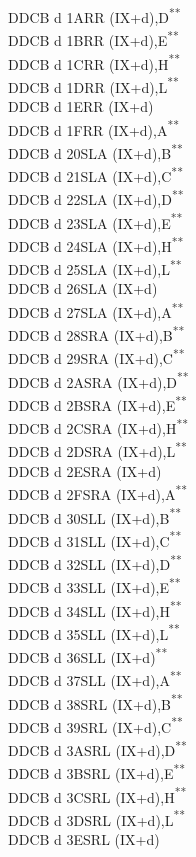 \documentclass[12pt,twoside,openright,a4paper]{book}
\newcommand{\UNDOC}{\textnormal{\textsuperscript{**}}}
\begin{document}
\begin{multicols}{3}
{\begin{tabbing}
	DDCB d 1A\>RR (IX+d),D\UNDOC\\
	DDCB d 1B\>RR (IX+d),E\UNDOC\\
	DDCB d 1C\>RR (IX+d),H\UNDOC\\
	DDCB d 1D\>RR (IX+d),L\UNDOC\\
	DDCB d 1E\>RR (IX+d)\\
	DDCB d 1F\>RR (IX+d),A\UNDOC\\
	DDCB d 20\>SLA (IX+d),B\UNDOC\\
	DDCB d 21\>SLA (IX+d),C\UNDOC\\
	DDCB d 22\>SLA (IX+d),D\UNDOC\\
	DDCB d 23\>SLA (IX+d),E\UNDOC\\
	DDCB d 24\>SLA (IX+d),H\UNDOC\\
	DDCB d 25\>SLA (IX+d),L\UNDOC\\
	DDCB d 26\>SLA (IX+d)\\
	DDCB d 27\>SLA (IX+d),A\UNDOC\\
	DDCB d 28\>SRA (IX+d),B\UNDOC\\
	DDCB d 29\>SRA (IX+d),C\UNDOC\\
	DDCB d 2A\>SRA (IX+d),D\UNDOC\\
	DDCB d 2B\>SRA (IX+d),E\UNDOC\\
	DDCB d 2C\>SRA (IX+d),H\UNDOC\\
	DDCB d 2D\>SRA (IX+d),L\UNDOC\\
	DDCB d 2E\>SRA (IX+d)\\
	DDCB d 2F\>SRA (IX+d),A\UNDOC\\
	DDCB d 30\>SLL (IX+d),B\UNDOC\\
	DDCB d 31\>SLL (IX+d),C\UNDOC\\
	DDCB d 32\>SLL (IX+d),D\UNDOC\\
	DDCB d 33\>SLL (IX+d),E\UNDOC\\
	DDCB d 34\>SLL (IX+d),H\UNDOC\\
	DDCB d 35\>SLL (IX+d),L\UNDOC\\
	DDCB d 36\>SLL (IX+d)\UNDOC\\
	DDCB d 37\>SLL (IX+d),A\UNDOC\\
	DDCB d 38\>SRL (IX+d),B\UNDOC\\
	DDCB d 39\>SRL (IX+d),C\UNDOC\\
	DDCB d 3A\>SRL (IX+d),D\UNDOC\\
	DDCB d 3B\>SRL (IX+d),E\UNDOC\\
	DDCB d 3C\>SRL (IX+d),H\UNDOC\\
	DDCB d 3D\>SRL (IX+d),L\UNDOC\\
	DDCB d 3E\>SRL (IX+d)\\

\end{tabbing}}
\end{multicols}
\end{document}
